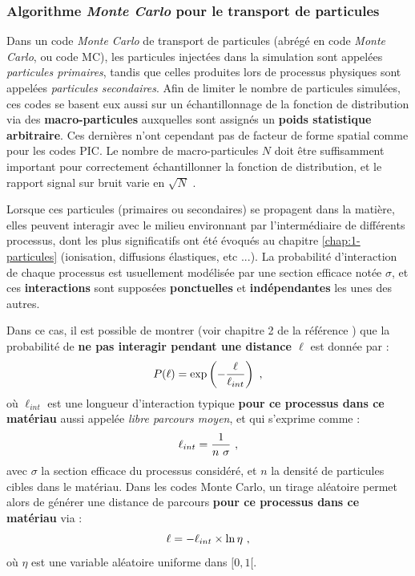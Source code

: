 \begin{refsection}
\subsubsection{Algorithme \textit{Monte Carlo} pour le transport de particules}

Dans un code \textit{Monte Carlo} de transport de particules (abrégé en code \textit{Monte Carlo}, ou code MC), les particules injectées dans la simulation sont appelées \textit{particules primaires}, tandis que celles produites lors de processus physiques sont appelées \textit{particules secondaires}. Afin de limiter le nombre de particules simulées, ces codes se basent eux aussi sur un échantillonnage de la fonction de distribution via des \textbf{macro-particules} auxquelles sont assignés un \textbf{poids statistique arbitraire}. Ces dernières n'ont cependant pas de facteur de forme spatial comme pour les codes PIC. Le nombre de macro-particules $N$ doit être suffisamment important pour correctement échantillonner la fonction de distribution, et le rapport signal sur bruit varie en $\sqrt{N}$ \parencite{haghighat_2015}.

Lorsque ces particules (primaires ou secondaires) se propagent dans la matière, elles peuvent interagir avec le milieu environnant par l'intermédiaire de différents processus, dont les plus significatifs ont été évoqués au chapitre \ref{chap:1-particules} (ionisation, diffusions élastiques, etc ...). La probabilité d'interaction de chaque processus est usuellement modélisée par une section efficace notée $\sigma$, et ces \textbf{interactions} sont supposées \textbf{ponctuelles} et \textbf{indépendantes} les unes des autres.

Dans ce cas, il est possible de montrer (voir chapitre 2 de la référence \parencite{rax_2007}) que la probabilité de \textbf{ne pas interagir pendant une distance $\ell$} est donnée par \parencite{geant4_physref, haghighat_2015} :
\begin{equation}
    P(\ell)= \exp\left(-\dfrac{\ell}{\ell_{int}}\right)~ \rm ,
\end{equation}
où $\ell_{int}$ est une longueur d'interaction typique \textbf{pour ce processus dans ce matériau} aussi appelée \textit{libre parcours moyen}, et qui s'exprime comme :
\begin{equation}
    \ell_{int} = \dfrac{1}{n ~ \sigma} ~ \rm ,
\end{equation}
avec $\sigma$ la section efficace du processus considéré, et $n$ la densité de particules cibles dans le matériau.
Dans les codes Monte Carlo, un tirage aléatoire permet alors de générer une distance de parcours \textbf{pour ce processus dans ce matériau} via \parencite{haghighat_2015} :
\begin{equation}
    \ell = - \ell_{int} \times \ln{\eta} ~ \rm ,
\end{equation}
où $\eta$ est une variable aléatoire uniforme dans $[0,1[$.


\end{refsection}
